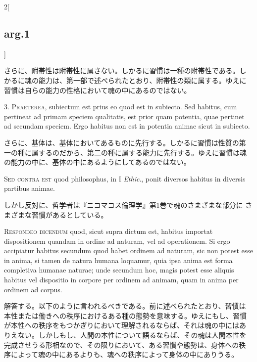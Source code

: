 \documentclass[paper=a4paper,fontsize=10pt,jafontsize=9pt,titlepage]{jlreq}
\begin{document}
\begin{paracol}{2}[\subsection{arg.1}]
\switchcolumn

さらに、附帯性は附帯性に属さない。しかるに習慣は一種の附帯性である。し
かるに魂の能力は、第一部で述べられたとおり、附帯性の類に属する。ゆえに
習慣は自らの能力の性格において魂の中にあるのではない。


3. {\scshape Praeterea}, subiectum est prius eo quod est in subiecto. Sed habitus,
cum pertineat ad primam speciem qualitatis, est prior quam potentia,
quae pertinet ad secundam speciem. Ergo habitus non est in potentia
animae sicut in subiecto.

\switchcolumn

さらに、基体は、基体においてあるものに先行する。しかるに習慣は性質の第
一の種に属するのだから、第二の種に属する能力に先行する。ゆえに習慣は魂
の能力の中に、基体の中にあるようにしてあるのではない。

\switchcolumn*[\subsection{s.c.}]

{\scshape Sed contra est} quod philosophus, in I {\itshape Ethic}., ponit diversos habitus
in diversis partibus animae.

\switchcolumn

しかし反対に、哲学者は『ニコマコス倫理学』第1巻で魂のさまざまな部分に
さまざまな習慣があるとしている。


{\scshape Respondeo dicendum} quod, sicut supra dictum est, habitus importat
dispositionem quandam in ordine ad naturam, vel ad operationem. Si
ergo accipiatur habitus secundum quod habet ordinem ad naturam, sic
non potest esse in anima, si tamen de natura humana loquamur, quia
ipsa anima est forma completiva humanae naturae; unde secundum hoc,
magis potest esse aliquis habitus vel dispositio in corpore per
ordinem ad animam, quam in anima per ordinem ad corpus.

\switchcolumn

解答する。以下のように言われるべきである。前に述べられたとおり、習慣は
本性または働きへの秩序におけるある種の態勢を意味する。ゆえにもし、習慣
が本性への秩序をもつかぎりにおいて理解されるならば、それは魂の中にはあ
りえない。しかしもし、人間の本性について語るならば、その魂は人間本性を
完成させうる形相なので、その限りにおいて、ある習慣や態勢は、身体への秩
序によって魂の中にあるよりも、魂への秩序によって身体の中にありうる。


\end{paracol}
\end{document}
